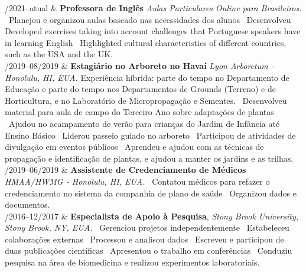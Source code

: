 \documentclass[11pt, a4paper]{article}
\newcommand{\Duration}[2]{\fontsize{10pt}{0}\selectfont #1--#2}
\begin{document}
\begin{EntriesTable}

	\Duration{02/2021}{atual}  &
	\textbf{Professora de Inglês}
	\newline
	\textit{Aulas Particulares Online para Brasileiros.}
	\newline
	\textbullet \ Planejou e organizou aulas baseado nas necessidades dos alunos 
	\textbullet \ Desenvolveu Developed exercises taking into account challenges that
	Portuguese speakers have in learning English
	\textbullet \ Highlighted cultural characteristics of different countries,
	such as the USA and the UK.
	\\

	\Duration{06/2019}{08/2019}  &
	\textbf{Estagiário no Arboreto no Havaí}
	\newline
	\textit{Lyon Arboretum - Honolulu, HI, EUA.}
	\newline
	Experiência híbrida: parte do tempo no Departamento de Educação e parte do tempo nos Departamentos de Grounds (Terreno) e de Horticultura, e no Laboratório de Micropropagação e Sementes. \textbullet \ Desenvolveu material para aula de campo do Terceiro Ano sobre adaptações de plantas \textbullet \ Ajudou no acampamento de verão para crianças do Jardim de Infância até Ensino Básico \textbullet \ Liderou passeio guiado no arboreto \textbullet \ Participou de atividades de divulgação em eventos públicos \textbullet \ Aprendeu e ajudou com as técnicas de propagação e identificação de plantas, e ajudou a manter os jardins e as trilhas.
	\\

	\Duration{03/2019}{06/2019}  &
	\textbf{Assistente de Credenciamento de Médicos}
	\newline
	\textit{HMAA/HWMG - Honolulu, HI, EUA.}
	\newline
	\textbullet \ Contatou médicos para refazer o credenciamento no sistema da companhia de plano de saúde \textbullet \ Organizou dados e documentos.
	\\

	\Duration{08/2016}{12/2017}  &
	\textbf{Especialista de Apoio à Pesquisa},
	\newline
	\textit{Stony Brook University, Stony Brook, NY, EUA.}
	\newline
	\textbullet \ Gerenciou projetos independentemente \textbullet \ Estabeleceu colaborações externas \textbullet \ Processou e analisou dados \textbullet \ Escreveu e participou de duas publicações científicas \textbullet \ Apresentou o trabalho em conferências \textbullet\ Conduziu pesquisa na área de biomedicina e realizou experimentos laboratoriais.
	\\

\end{EntriesTable}
\end{document}
